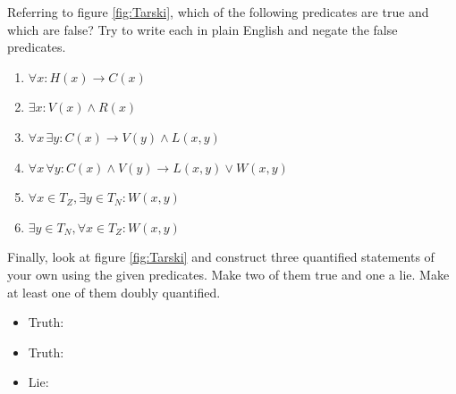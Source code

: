 \begin{practiceprob}\label{prob:tarski_zombies}
Referring to figure \ref{fig:Tarski}, which of the following predicates are true and which are false?  Try to write each in plain English and negate the false predicates.
\begin{enumerate}
\setlength{\itemsep}{40pt}
    \item \(\displaystyle\forall x: H(x)\rightarrow C(x)\)
    \item \(\displaystyle\exists x: V(x)\wedge R(x)\)
    \item \(\displaystyle\forall x\, \exists y: C(x)\rightarrow V(y)\wedge L(x,y)\)
    \item \(\displaystyle\forall x\, \forall y: C(x)\wedge V(y)\rightarrow L(x,y)\vee W(x,y)\)
    \item \(\displaystyle\forall x\in T_Z, \exists y\in T_N: W(x,y)\)
    \item \(\displaystyle\exists y\in T_N, \forall x\in T_Z: W(x,y)\)\vspace{35pt}
\end{enumerate}
Finally, look at figure \ref{fig:Tarski} and construct three quantified statements of your own using the given predicates.  Make two of them true and one a lie.  Make at least one of them doubly quantified.
\begin{itemize}
\setlength{\itemsep}{40pt}
    \item Truth:
    \item Truth:
    \item Lie:\vspace{35pt}
\end{itemize}
\end{practiceprob}

